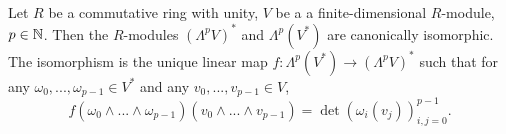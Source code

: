 \begin{proposition}
  Let
    $R$ be a commutative ring with unity,
    $V$ be a a finite-dimensional $R$-module,
    $p \in \mathbb{N}$.
  Then the $R$-modules $(\Lambda^p V)^*$ and $\Lambda^p (V^*)$
  are canonically isomorphic.
  The isomorphism is the unique linear map
  $f \colon \Lambda^p (V^*) \to (\Lambda^p V)^*$ such that
  for any $\omega_0, ..., \omega_{p - 1} \in V^*$
  and any $v_0, ..., v_{p - 1} \in V$,
  \begin{equation}
    f(\omega_0 \wedge ... \wedge \omega_{p - 1})
    (v_0 \wedge ... \wedge v_{p - 1})
    = \det (\omega_i(v_j))_{i, j = 0}^{p - 1}.
  \end{equation}
\end{proposition}
